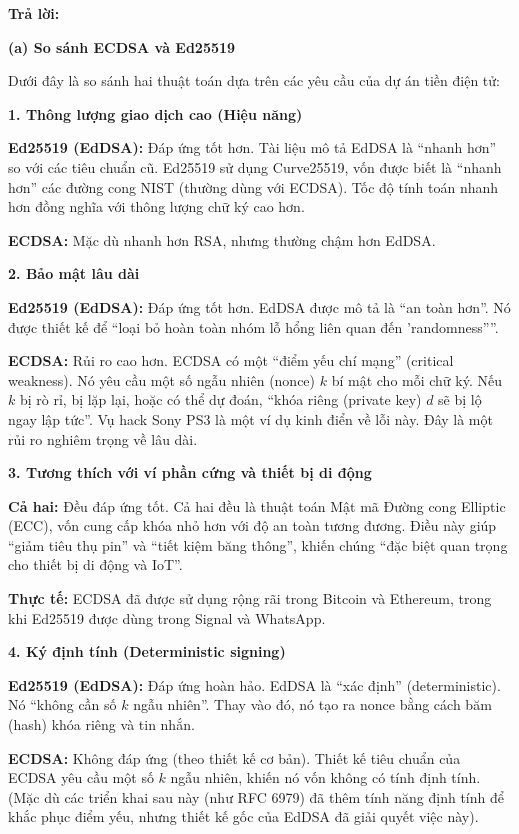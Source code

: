 \begin{center}
    \textbf{Trả lời:}
\end{center}

\textbf{(a) So sánh ECDSA và Ed25519}

Dưới đây là so sánh hai thuật toán dựa trên các yêu cầu của dự án tiền điện tử:

\textbf{1. Thông lượng giao dịch cao (Hiệu năng)}

\textbf{Ed25519 (EdDSA):} Đáp ứng tốt hơn. Tài liệu mô tả EdDSA là ``nhanh hơn'' so với các tiêu chuẩn cũ. Ed25519 sử dụng Curve25519, vốn được biết là ``nhanh hơn'' các đường cong NIST (thường dùng với ECDSA). Tốc độ tính toán nhanh hơn đồng nghĩa với thông lượng chữ ký cao hơn.

\textbf{ECDSA:} Mặc dù nhanh hơn RSA, nhưng thường chậm hơn EdDSA.

\textbf{2. Bảo mật lâu dài}

\textbf{Ed25519 (EdDSA):} Đáp ứng tốt hơn. EdDSA được mô tả là ``an toàn hơn''. Nó được thiết kế để ``loại bỏ hoàn toàn nhóm lỗ hổng liên quan đến 'randomness''''.

\textbf{ECDSA:} Rủi ro cao hơn. ECDSA có một ``điểm yếu chí mạng'' (critical weakness). Nó yêu cầu một số ngẫu nhiên (nonce) $k$ bí mật cho mỗi chữ ký. Nếu $k$ bị rò rỉ, bị lặp lại, hoặc có thể dự đoán, ``khóa riêng (private key) $d$ sẽ bị lộ ngay lập tức''. Vụ hack Sony PS3 là một ví dụ kinh điển về lỗi này. Đây là một rủi ro nghiêm trọng về lâu dài.

\textbf{3. Tương thích với ví phần cứng và thiết bị di động}

\textbf{Cả hai:} Đều đáp ứng tốt. Cả hai đều là thuật toán Mật mã Đường cong Elliptic (ECC), vốn cung cấp khóa nhỏ hơn với độ an toàn tương đương. Điều này giúp ``giảm tiêu thụ pin'' và ``tiết kiệm băng thông'', khiến chúng ``đặc biệt quan trọng cho thiết bị di động và IoT''.

\textbf{Thực tế:} ECDSA đã được sử dụng rộng rãi trong Bitcoin và Ethereum, trong khi Ed25519 được dùng trong Signal và WhatsApp.

\textbf{4. Ký định tính (Deterministic signing)}

\textbf{Ed25519 (EdDSA):} Đáp ứng hoàn hảo. EdDSA là ``xác định'' (deterministic). Nó ``không cần số $k$ ngẫu nhiên''. Thay vào đó, nó tạo ra nonce bằng cách băm (hash) khóa riêng và tin nhắn.

\textbf{ECDSA:} Không đáp ứng (theo thiết kế cơ bản). Thiết kế tiêu chuẩn của ECDSA yêu cầu một số $k$ ngẫu nhiên, khiến nó vốn không có tính định tính. (Mặc dù các triển khai sau này (như RFC 6979) đã thêm tính năng định tính để khắc phục điểm yếu, nhưng thiết kế gốc của EdDSA đã giải quyết việc này).

